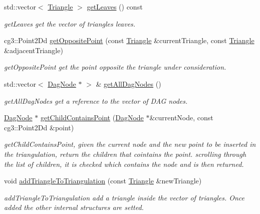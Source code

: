 \begin{DoxyCompactItemize}
std\+::vector$<$ \hyperlink{classTriangle}{Triangle} $>$ \hyperlink{classDelauneyTriangulation_af18a99c7d626b657f7f7eb34f6d359b6}{get\+Leaves} () const
\begin{DoxyCompactList}\small\item\em get\+Leaves get the vector of triangles leaves. \end{DoxyCompactList}\item 
cg3\+::\+Point2\+Dd \hyperlink{classDelauneyTriangulation_a546df770889fa51378bd6e65e1825b3c}{get\+Opposite\+Point} (const \hyperlink{classTriangle}{Triangle} \&current\+Triangle, const \hyperlink{classTriangle}{Triangle} \&adjacent\+Triangle)
\begin{DoxyCompactList}\small\item\em get\+Opposite\+Point get the point opposite the triangle under consideration. \end{DoxyCompactList}\item 
std\+::vector$<$ \hyperlink{classDagNode}{Dag\+Node} $\ast$ $>$ \& \hyperlink{classDelauneyTriangulation_a3f0c51faef713227596d9b54bddcd0a7}{get\+All\+Dag\+Nodes} ()
\begin{DoxyCompactList}\small\item\em get\+All\+Dag\+Nodes get a reference to the vector of D\+AG nodes. \end{DoxyCompactList}\item 
\hyperlink{classDagNode}{Dag\+Node} $\ast$ \hyperlink{classDelauneyTriangulation_a40358f651aade3605321bfdee412ffc8}{get\+Child\+Contains\+Point} (\hyperlink{classDagNode}{Dag\+Node} $\ast$\&current\+Node, const cg3\+::\+Point2\+Dd \&point)
\begin{DoxyCompactList}\small\item\em get\+Child\+Contains\+Point, given the current node and the new point to be inserted in the triangulation, return the children that cointains the point. scrolling through the list of children, it is checked which contains the node and is then returned. \end{DoxyCompactList}\item 
void \hyperlink{classDelauneyTriangulation_a276538553a118707d395659d035cc1a4}{add\+Triangle\+To\+Triangulation} (const \hyperlink{classTriangle}{Triangle} \&new\+Triangle)
\begin{DoxyCompactList}\small\item\em add\+Triangle\+To\+Triangulation add a triangle inside the vector of triangles. Once added the other internal structures are setted. \end{DoxyCompactList}\item 

\end{DoxyCompactItemize}
